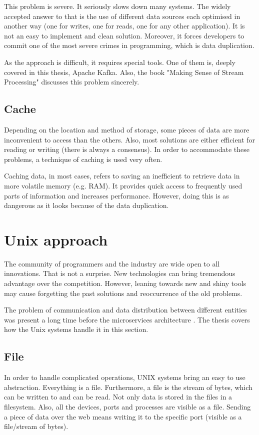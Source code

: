 This problem is severe. It seriously slows down many systems. The widely accepted answer to that is the use of different data sources each optimised in another way (one for writes, one for reads, one for any other application). It is not an easy to implement and clean solution. Moreover, it forces developers to commit one of the most severe crimes in programming, which is data duplication.

As the approach is difficult, it requires special tools. One of them is, deeply covered in this thesis, Apache Kafka. Also, the book "Making Sense of Stream Processing" \cite{streams} discusses this problem sincerely.



\subsection{Cache}
\label{subsec:cache}
Depending on the location and method of storage, some pieces of data are more inconvenient to access than the others. Also, most solutions are either efficient for reading or writing (there is always a consensus). In order to accommodate these problems, a technique of caching is used very often. 

Caching data, in most cases, refers to saving an inefficient to retrieve data in more volatile memory (e.g. RAM). It provides quick access to frequently used parts of information and increases performance. However, doing this is as dangerous as it looks because of the data duplication. 


\section{Unix approach}
\label{sec:unixApproach}
The community of programmers and the industry are wide open to all innovations. That is not a surprise. New technologies can bring tremendous advantage over the competition. However, leaning towards new and shiny tools may cause forgetting the past solutions and reoccurrence of the old problems. 

The problem of communication and data distribution between different entities was present a long time before the microservices architecture \cite{streams}. The thesis covers how the Unix systems handle it in this section. 

\subsection{File}
\label{subsec:file}
In order to handle complicated operations, UNIX systems bring an easy to use abstraction. Everything is a file. Furthermore, a file is the stream of bytes, which can be written to and can be read. Not only data is stored in the files in a filesystem. Also, all the devices, ports and processes are visible as a file. Sending a piece of data over the web means writing it to the specific port (visible as a file/stream of bytes). 

